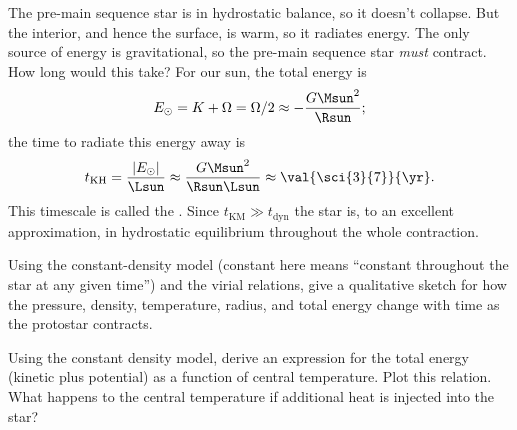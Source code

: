 The pre-main sequence star is in hydrostatic balance, so it doesn't collapse. But the interior, and hence the surface, is warm, so it radiates energy.  The only source of energy is gravitational, so the pre-main sequence star \emph{must} contract.  How long would this take?  For our sun, the total energy is
\[
	E_{\odot} = K + \Omega = \Omega/2 \approx -\frac{G\Msun^{2}}{\Rsun};
\]
the time to radiate this energy away is
\begin{equation}\label{e.kelvin-helmholtz}
t_{\mathrm{KH}} = \frac{|E_{\odot}|}{\Lsun} \approx \frac{G\Msun^{2}}{\Rsun\Lsun} \approx \val{\sci{3}{7}}{\yr}.
\end{equation}
This timescale is called the .  Since $t_{\mathrm{KM}} \gg t_{\mathrm{dyn}}$ the star is, to an excellent approximation, in hydrostatic equilibrium throughout the whole contraction.

\begin{exercisebox}
\label{ex.contraction-constant-density-protostar}
Using the constant-density model (constant here means ``constant throughout the star at any given time'') and the virial relations, give a qualitative sketch for how the pressure, density, temperature, radius, and total energy change with time as the protostar contracts.
\end{exercisebox}

\begin{exercisebox}
Using the constant density model, derive an expression for the total energy (kinetic plus potential) as a function of central temperature. Plot this relation.  What happens to the central temperature if additional heat is injected into the star?
\end{exercisebox}

